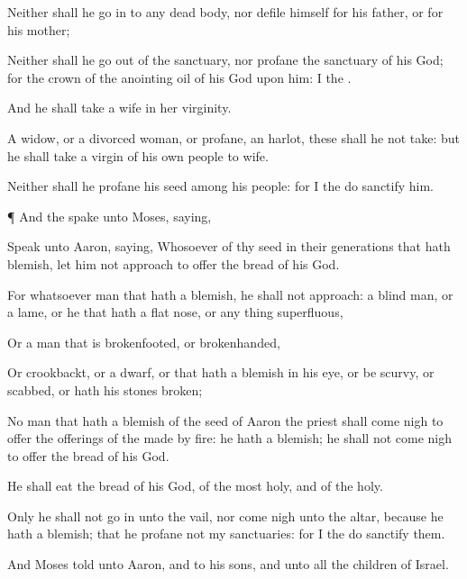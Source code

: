 {Neither shall he go
in to any
dead
body, nor
defile himself for his
father, or for his
mother;

Neither shall he go
out of the
sanctuary, nor
profane the
sanctuary of his
God; for the
crown of the
anointing
oil of his
God
{} upon him: I
{} the
{}.

And he shall
take a
wife in her
virginity.

A
widow, or a divorced
woman, or
profane,
{} an
harlot, these shall he not
take: but he shall
take a
virgin of his own
people to
wife.

Neither shall he
profane his
seed among his
people: for I the
{} do
sanctify him.


\par }{\PP {}¶ And the
{}
spake unto
Moses,
saying,

Speak unto
Aaron,
saying,
Whosoever
{} of thy
seed in their
generations that hath
{}
blemish, let him not
approach to
offer the
bread of his
God.

For whatsoever
man
{} that hath a
blemish, he shall not
approach: a
blind
man, or a
lame, or he that hath a flat
nose, or any thing
superfluous,

Or a
man that is
brokenfooted, or
brokenhanded,

Or
crookbackt, or a
dwarf, or that hath a
blemish in his
eye, or be
scurvy, or
scabbed, or hath his
stones
broken;

No
man that hath a
blemish of the
seed of
Aaron the
priest shall come
nigh to
offer the
offerings of the
{} made by
fire: he hath a
blemish; he shall not come
nigh to
offer the
bread of his
God.

He shall
eat the
bread of his
God,
{} of the
most
holy, and of the
holy.

Only he shall not go
in unto the
vail, nor come
nigh unto the
altar, because he hath a
blemish; that he
profane not my
sanctuaries: for I the
{} do
sanctify them.

And
Moses
told
{} unto
Aaron, and to his
sons, and unto all the
children of
Israel.




\par }
